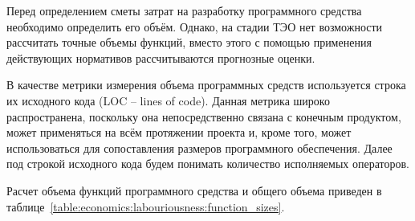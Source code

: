 Перед определением сметы затрат на разработку программного средства необходимо определить его объём. Однако, на стадии ТЭО нет возможности рассчитать точные объемы функций, вместо этого с помощью применения действующих нормативов рассчитываются прогнозные оценки. 

В качестве метрики измерения объема программных средств используется строка их исходного кода (LOC -- lines of code). Данная метрика широко распространена, поскольку она непосредственно связана с конечным продуктом, может применяться на всём протяжении проекта и, кроме того, может использоваться для сопоставления размеров программного обеспечения. Далее под строкой исходного кода будем понимать количество исполняемых операторов.

Расчет объема функций программного средства и общего объема приведен в таблице~\ref{table:economics:labouriousness:function_sizes}. 

